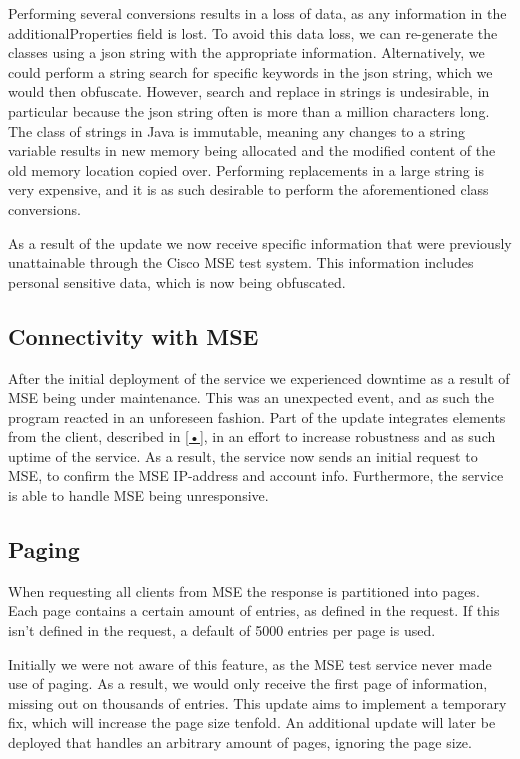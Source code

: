 Performing several conversions results in a loss of data, as any information in the additionalProperties field is lost. To avoid this data loss, we can re-generate the classes using a json string with the appropriate information. Alternatively, we could perform a string search for specific keywords in the json string, which we would then obfuscate. However, search and replace in strings is undesirable, in particular because the json string often is more than a million characters long. The class of strings in Java is immutable, meaning any changes to a string variable results in new memory being allocated and the modified content of the old memory location copied over. Performing replacements in a large string is very expensive, and it is as such desirable to perform the aforementioned class conversions. 

As a result of the update we now receive specific information that were previously unattainable through the Cisco MSE test system. This information includes personal sensitive data, which is now being obfuscated. 

\subsection{Connectivity with MSE}
After the initial deployment of the service we experienced downtime as a result of MSE being under maintenance. This was an unexpected event, and as such the program reacted in an unforeseen fashion. Part of the update integrates elements from the client, described in \ref{•}, in an effort to increase robustness and as such uptime of the service. As a result, the service now sends an initial request to MSE, to confirm the MSE IP-address and account info. Furthermore, the service is able to handle MSE being unresponsive.

\subsection{Paging}
When requesting all clients from MSE the response is partitioned into pages. Each page contains a certain amount of entries, as defined in the request. If this isn't defined in the request, a default of 5000 entries per page is used. 

Initially we were not aware of this feature, as the MSE test service never made use of paging. As a result, we would only receive the first page of information, missing out on thousands of entries. This update aims to implement a temporary fix, which will increase the page size tenfold. An additional update will later be deployed that handles an arbitrary amount of pages, ignoring the page size.